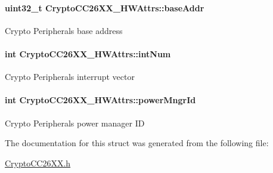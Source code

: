 \paragraph[{base\+Addr}]{\setlength{\rightskip}{0pt plus 5cm}uint32\+\_\+t Crypto\+C\+C26\+X\+X\+\_\+\+H\+W\+Attrs\+::base\+Addr}\label{struct_crypto_c_c26_x_x___h_w_attrs_a8a6e2dbc65c24f641941ebe3c854e961}
Crypto Peripheral\textquotesingle{}s base address 
\paragraph[{int\+Num}]{\setlength{\rightskip}{0pt plus 5cm}int Crypto\+C\+C26\+X\+X\+\_\+\+H\+W\+Attrs\+::int\+Num}\label{struct_crypto_c_c26_x_x___h_w_attrs_a63cdd84637d1e9acca0315cd96d9891b}
Crypto Peripheral\textquotesingle{}s interrupt vector 
\paragraph[{power\+Mngr\+Id}]{\setlength{\rightskip}{0pt plus 5cm}int Crypto\+C\+C26\+X\+X\+\_\+\+H\+W\+Attrs\+::power\+Mngr\+Id}\label{struct_crypto_c_c26_x_x___h_w_attrs_ac5c27633092355d3606d6d0b240b2091}
Crypto Peripheral\textquotesingle{}s power manager I\+D 

The documentation for this struct was generated from the following file\+:\begin{DoxyCompactItemize}
\item 
\hyperlink{_crypto_c_c26_x_x_8h}{Crypto\+C\+C26\+X\+X.\+h}\end{DoxyCompactItemize}
